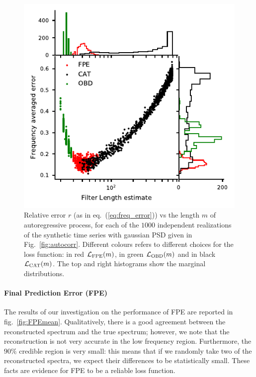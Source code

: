 \documentclass[twocolumn,showpacs,preprintnumbers,nofootinbib,prd,
superscriptaddress,10pt]{revtex4-1}
\begin{document}
\begin{figure}
	\centering
	\includegraphics[width = \linewidth]{Images/optimisers_comparison/normal/error_length_contour.pdf}
	\caption{Relative error $r$ (as in eq.~(\ref{eq:freq_error})) vs the length $m$ of autoregressive process, for each of the $1000$ independent realizations of the synthetic time series with gaussian PSD given in Fig.~\ref{fig:autocorr}. Different colours refers to different choices for the loss function: in red $\mathcal{L}_{\rm FPE}(m)$, in green $\mathcal{L}_{\rm OBD}(m)$ and in black $\mathcal{L}_{\rm CAT}(m)$. The top and right histograms show the marginal distributions.}
	\label{fig:optcomparison}
\end{figure}

\paragraph{Final Prediction Error (FPE)}
The results of our investigation on the performance of FPE are reported in fig.~\ref{fig:FPEmean}.
Qualitatively, there is a good agreement between the reconstructed spectrum and the true spectrum; however, we note that the reconstruction is not very accurate in the low frequency region. 
Furthermore, the $90\%$ credible region is very small: this means that if we randomly take two of the reconstructed spectra, we expect their differences to be statistically small.
These facts are evidence for FPE to be a reliable loss function.
\end{document}
